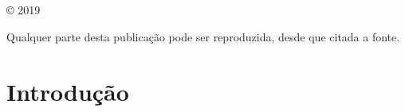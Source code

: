 \documentclass[
	12pt,				%
	openright,			%
	twoside,			%
	a4paper,			%
	english,			%
	french,				%
	brazil,				%
	sumario=tradicional
]{abntex2}
\numberwithin{example}{chapter}
\numberwithin{remark}{chapter}
\numberwithin{definition}{chapter}
\numberwithin{figure}{chapter}
\begin{document}
\frenchspacing

\frontmatter


\begin{titlingpage}
\phantom{xxx}
\vspace{0.5cm}
\huge
\raggedright
\imprimirautor\\
\vspace{2.5cm}
\huge 
{\raggedleft
\textit{\textcolor{blue}{\imprimirtitulo}}\\[1cm]
}
\centering 
\vfill
\Large
\imprimirinstituicao
\end{titlingpage}

\begin{titlingpage}

\phantom{xxx}
\vspace{0.5cm}
\huge
\raggedright
\imprimirautor\\
\vspace{2.5cm}
\huge 
{\raggedleft
\textit{\textcolor{blue}{\imprimirtitulo}}\\[1cm]
}
\centering 
\vfill
\Large
\imprimirinstituicao

\clearpage
\ABNTEXfontereduzida
© 2019 \imprimirautor

Qualquer parte desta publicação pode ser reproduzida, desde que citada a fonte.
\vspace*{\fill}

\end{titlingpage}

\listoffigures*
\cleardoublepage

\listoftables*
\cleardoublepage

\tableofcontents*
\cleardoublepage


\mainmatter

\chapter*[Introdução]{Introdução}
\end{document}
